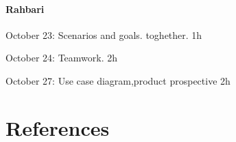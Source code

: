 \documentclass{article}
\begin{document}
	\paragraph{Rahbari}
		\begin{list}{-}{}
			\item October 23: Scenarios and goals. toghether. 1h
			\item October 24: Teamwork. 2h
			\item October 27: Use case diagram,product prospective 2h
		\end{list}
\section{References}
\end{document}

